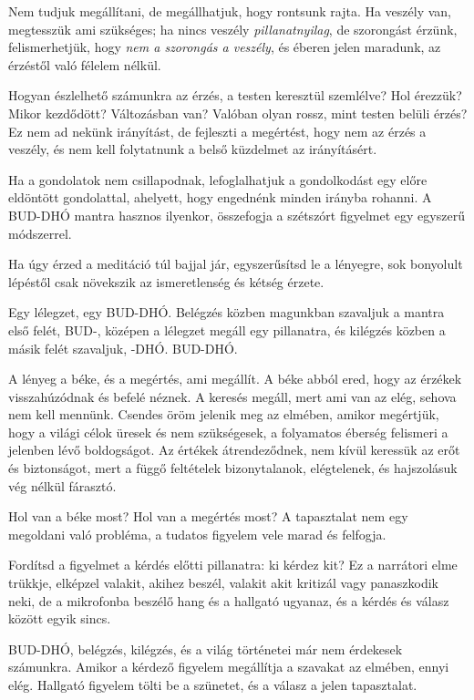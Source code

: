 Nem tudjuk megállítani, de megállhatjuk, hogy rontsunk rajta. Ha veszély
van, megtesszük ami szükséges; ha nincs veszély \emph{pillanatnyilag},
de szorongást érzünk, felismerhetjük, hogy \emph{nem a szorongás a
veszély}, és éberen jelen maradunk, az érzéstől való félelem nélkül.


Hogyan észlelhető számunkra az érzés, a testen keresztül szemlélve? Hol
érezzük? Mikor kezdődött? Változásban van? Valóban olyan rossz, mint
testen belüli érzés? Ez nem ad nekünk irányítást, de fejleszti a
megértést, hogy nem az érzés a veszély, és nem kell folytatnunk a belső
küzdelmet az irányításért.

Ha a gondolatok nem csillapodnak, lefoglalhatjuk a gondolkodást egy
előre eldöntött gondolattal, ahelyett, hogy engednénk minden irányba
rohanni. A BUD-DHÓ mantra hasznos ilyenkor, összefogja a szétszórt
figyelmet egy egyszerű módszerrel.

Ha úgy érzed a meditáció túl bajjal jár, egyszerűsítsd le a lényegre,
sok bonyolult lépéstől csak növekszik az ismeretlenség és kétség érzete.

Egy lélegzet, egy BUD-DHÓ. Belégzés közben magunkban szavaljuk a mantra
első felét, BUD-, középen a lélegzet megáll egy pillanatra, és kilégzés
közben a másik felét szavaljuk, -DHÓ. BUD-DHÓ.

A lényeg a béke, és a megértés, ami megállít. A béke abból ered, hogy az
érzékek visszahúzódnak és befelé néznek. A keresés megáll, mert ami van
az elég, sehova nem kell mennünk. Csendes öröm jelenik meg az elmében,
amikor megértjük, hogy a világi célok üresek és nem szükségesek, a
folyamatos éberség felismeri a jelenben lévő boldogságot. Az értékek
átrendeződnek, nem kívül keressük az erőt és biztonságot, mert a függő
feltételek bizonytalanok, elégtelenek, és hajszolásuk vég nélkül
fárasztó.

Hol van a béke most? Hol van a megértés most? A tapasztalat nem egy
megoldani való probléma, a tudatos figyelem vele marad és felfogja.

Fordítsd a figyelmet a kérdés előtti pillanatra: ki kérdez kit? Ez a
narrátori elme trükkje, elképzel valakit, akihez beszél, valakit akit
kritizál vagy panaszkodik neki, de a mikrofonba beszélő hang és a
hallgató ugyanaz, és a kérdés és válasz között egyik sincs.

BUD-DHÓ, belégzés, kilégzés, és a világ történetei már nem érdekesek
számunkra. Amikor a kérdező figyelem megállítja a szavakat az elmében,
ennyi elég. Hallgató figyelem tölti be a szünetet, és a válasz a jelen
tapasztalat.

